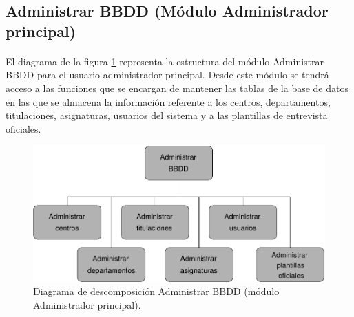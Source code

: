 \subsection{Administrar BBDD (Módulo Administrador principal)}

  \paragraph{}El diagrama de la figura
  \ref{diagramaDescomposicionAdministrarBBDD} representa la estructura del
  módulo Administrar BBDD para el usuario administrador principal. Desde este
  módulo se tendrá acceso a las funciones que se encargan de mantener las tablas
  de la base de datos en las que se almacena la información referente a los
  centros, departamentos, titulaciones, asignaturas, usuarios del sistema y
  a las plantillas de entrevista oficiales.

  \begin{figure}[!ht]
    \begin{center}
      \includegraphics[]{11.Disenyo_Arquitectonico/11.2.Diagramas_Descomposicion/11.2.2.Modulo_administrador_principal/AdministrarBBDD/Diagramas/administrar_bbdd.pdf}
      \caption{Diagrama de descomposición Administrar BBDD (módulo Administrador principal).}
      \label{diagramaDescomposicionAdministrarBBDD}
    \end{center}
  \end{figure}







